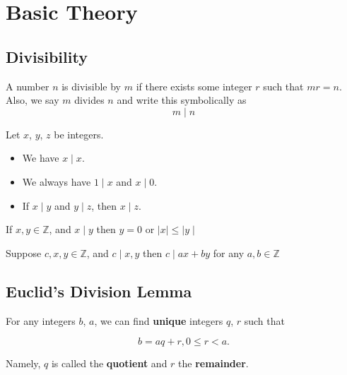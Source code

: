 \chapter{Basic Theory}
\section{Divisibility}

\begin{definition}
    A number $n$ is divisible by $m$ if there exists some integer $r$ such that $mr=n$. Also, we say $m$
divides $n$ and write this symbolically as
\[
m \mid n
\] 
\end{definition}

\begin{theorem}
    Let $x$, $y$, $z$ be integers.

    \begin{itemize}
        \item We have $x \mid x$.
        \item We always have $1 \mid x$ and $x \mid 0$.
        \item If $x \mid y$ and $y \mid z$, then $x \mid z$.
    \end{itemize}
\end{theorem}

\begin{theorem}

If $ x, y \in \mathbb{Z}$, and $x \mid y$ then $y=0$ or $\mid x \mid \leq \mid y \mid$

\end{theorem}

\begin{theorem}

Suppose $ c, x, y \in \mathbb{Z}$, and $c \mid x, y$ then $c \mid a x + b y$ for any $a, b \in \mathbb{Z}$
 
\end{theorem}

\section{Euclid's Division Lemma}

\begin{theorem}
    For any integers $b$, $a$, we can find \textbf{unique}
integers $q$, $r$ such that

\[b = aq + r, 0 \leq r < a.\]

Namely, $q$ is called the \textbf{quotient} and $r$ the \textbf{remainder}.
\end{theorem}


